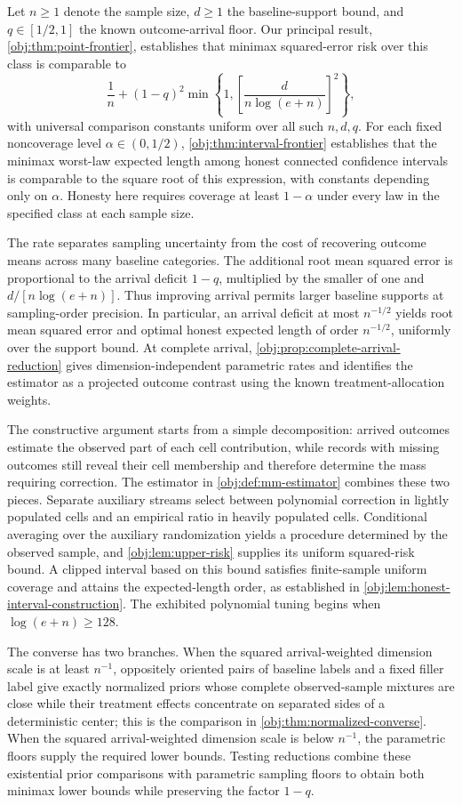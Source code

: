 Let \(n\ge1\) denote the sample size, \(d\ge1\) the baseline-support bound, and \(q\in[1/2,1]\) the known outcome-arrival floor. Our principal result, \cref{obj:thm:point-frontier}, establishes that minimax squared-error risk over this class is comparable to
\[
\frac1n+(1-q)^2
\min\left\{1,\left[\frac{d}{n\log(e+n)}\right]^2\right\},
\]
with universal comparison constants uniform over all such \(n,d,q\). For each fixed noncoverage level \(\alpha\in(0,1/2)\), \cref{obj:thm:interval-frontier} establishes that the minimax worst-law expected length among honest connected confidence intervals is comparable to the square root of this expression, with constants depending only on \(\alpha\). Honesty here requires coverage at least \(1-\alpha\) under every law in the specified class at each sample size.

The rate separates sampling uncertainty from the cost of recovering outcome means across many baseline categories. The additional root mean squared error is proportional to the arrival deficit \(1-q\), multiplied by the smaller of one and \(d/[n\log(e+n)]\). Thus improving arrival permits larger baseline supports at sampling-order precision. In particular, an arrival deficit at most \(n^{-1/2}\) yields root mean squared error and optimal honest expected length of order \(n^{-1/2}\), uniformly over the support bound. At complete arrival, \cref{obj:prop:complete-arrival-reduction} gives dimension-independent parametric rates and identifies the estimator as a projected outcome contrast using the known treatment-allocation weights.

The constructive argument starts from a simple decomposition: arrived outcomes estimate the observed part of each cell contribution, while records with missing outcomes still reveal their cell membership and therefore determine the mass requiring correction. The estimator in \cref{obj:def:mm-estimator} combines these two pieces. Separate auxiliary streams select between polynomial correction in lightly populated cells and an empirical ratio in heavily populated cells. Conditional averaging over the auxiliary randomization yields a procedure determined by the observed sample, and \cref{obj:lem:upper-risk} supplies its uniform squared-risk bound. A clipped interval based on this bound satisfies finite-sample uniform coverage and attains the expected-length order, as established in \cref{obj:lem:honest-interval-construction}. The exhibited polynomial tuning begins when \(\log(e+n)\ge128\).

The converse has two branches. When the squared arrival-weighted dimension scale is at least \(n^{-1}\), oppositely oriented pairs of baseline labels and a fixed filler label give exactly normalized priors whose complete observed-sample mixtures are close while their treatment effects concentrate on separated sides of a deterministic center; this is the comparison in \cref{obj:thm:normalized-converse}. When the squared arrival-weighted dimension scale is below \(n^{-1}\), the parametric floors supply the required lower bounds. Testing reductions combine these existential prior comparisons with parametric sampling floors to obtain both minimax lower bounds while preserving the factor \(1-q\).

